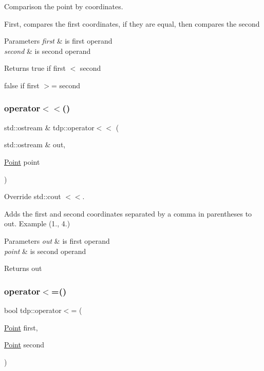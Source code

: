 Comparison the point by coordinates. 

First, compares the first coordinates, if they are equal, then compares the second 
\begin{DoxyParams}{Parameters}
{\em first} & is first operand \\
\hline
{\em second} & is second operand \\
\hline
\end{DoxyParams}
\begin{DoxyReturn}{Returns}
true if \textquotesingle{}first\textquotesingle{} $<$ \textquotesingle{}second\textquotesingle{} 

false if \textquotesingle{}first\textquotesingle{} $>$= \textquotesingle{}second\textquotesingle{} 
\end{DoxyReturn}
\mbox{\label{namespacetdp_a40a6deb04f2cc708b0cd33955e23ffb6}} 
\subsubsection{\texorpdfstring{operator$<$$<$()}{operator<<()}}
{\footnotesize\ttfamily std\+::ostream \& tdp\+::operator$<$$<$ (\begin{DoxyParamCaption}\item[{std\+::ostream \&}]{out,  }\item[{\mbox{\hyperlink{structtdp_1_1_point}{Point}}}]{point }\end{DoxyParamCaption})}



Override std\+::cout $<$$<$. 

Adds the first and second coordinates separated by a comma in parentheses to \textquotesingle{}out\textquotesingle{}. Example (1., 4.) 
\begin{DoxyParams}{Parameters}
{\em out} & is first operand \\
\hline
{\em point} & is second operand \\
\hline
\end{DoxyParams}
\begin{DoxyReturn}{Returns}
out 
\end{DoxyReturn}
\mbox{\label{namespacetdp_a3d677102635fab3ad0088b88378e5b48}} 
\subsubsection{\texorpdfstring{operator$<$=()}{operator<=()}}
{\footnotesize\ttfamily bool tdp\+::operator$<$= (\begin{DoxyParamCaption}\item[{\mbox{\hyperlink{structtdp_1_1_point}{Point}}}]{first,  }\item[{\mbox{\hyperlink{structtdp_1_1_point}{Point}}}]{second }\end{DoxyParamCaption})}



